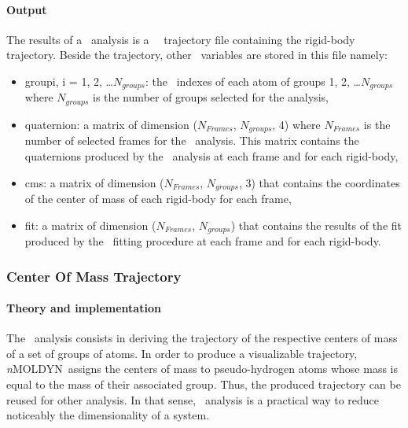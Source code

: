 \documentclass[a4paper,11pt]{report}
\newcommand{\NMOLDYN}{\textit{n}MOLDYN}
\begin{document}
\paragraph{Output\\}
The results of a \RBT\ analysis is a \MMTK\ \NetCDF\ trajectory file containing the rigid-body trajectory. Beside the 
trajectory, other \NetCDF\ variables are stored in this file namely:
\begin{itemize}
\item groupi, i = 1, 2, \ldots $N_{groups}$: the \MMTK\ indexes of each atom of groups 1, 2, \ldots $N_{groups}$ where 
$N_{groups}$ is the number of groups selected for the analysis,
\item quaternion: a matrix of dimension ($N_{Frames}$, $N_{groups}$, 4) where $N_{Frames}$ is the number of selected frames for the \RBT\ 
analysis. This matrix contains the quaternions produced by the \RBT\ analysis at each frame and for each rigid-body,
\item cms: a matrix of dimension ($N_{Frames}$, $N_{groups}$, 3) that contains the coordinates of the center of mass of each 
rigid-body for each frame,
\item fit: a matrix of dimension ($N_{Frames}$, $N_{groups}$) that contains the results of the fit produced by the \RBT\ 
fitting procedure at each frame and for each rigid-body.
\end{itemize}

\subsubsection{Center Of Mass Trajectory}
\label{comt}
\paragraph{Theory and implementation\\}
\label{comt_theory}
The \COMT\ analysis consists in deriving the trajectory of the respective centers of mass of a 
set of groups of atoms. In order to produce a visualizable trajectory, \NMOLDYN\ assigns the centers of mass to 
pseudo-hydrogen atoms whose mass is equal to the mass of their associated group. Thus, the produced trajectory can be reused 
for other analysis. In that sense, \COMT\ analysis is a practical way to reduce noticeably the dimensionality of a system.
\end{document}
